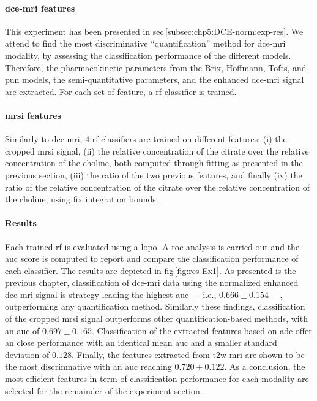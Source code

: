 \paragraph{\ac{dce}-\ac{mri} features} This experiment has been presented in \acs{sec}\,\ref{subsec:chp5:DCE-norm:exp-res}.
We attend to find the most discriminative ``quantification'' method for \ac{dce}-\ac{mri} modality, by assessing the classification performance of the different models.
Therefore, the pharmacokinetic parameters from the Brix, Hoffmann, Tofts, and \ac{pun} models, the semi-quantitative parameters, and the enhanced \ac{dce}-\ac{mri} signal are extracted.
For each set of feature, a \ac{rf} classifier is trained.

\paragraph{\ac{mrsi} features} Similarly to \ac{dce}-\ac{mri}, 4 \ac{rf} classifiers are trained on different features:
(i) the cropped \ac{mrsi} signal,
(ii) the relative concentration of the citrate over the relative concentration of the choline, both computed through fitting as presented in the previous section,
(iii) the ratio of the two previous features, and finally
(iv) the ratio of the relative concentration of the citrate over the relative concentration of the choline, using fix integration bounds.

\paragraph{Results}
Each trained \ac{rf} is evaluated using a \ac{lopo}.
A \ac{roc} analysis is carried out and the \ac{auc} score is computed to report and compare the classification performance of each classifier.
The results are depicted in \acs{fig}\,\ref{fig:res-Ex1}.
As presented is the previous chapter, classification of \ac{dce}-\ac{mri} data using the normalized enhanced \ac{dce}-\ac{mri} signal is strategy leading the highest \ac{auc} --- i.e., $0.666 \pm 0.154$ ---, outperforming any quantification method.
Similarly these findings, classification of the cropped \ac{mrsi} signal outperforms other quantification-based methods, with an \ac{auc} of $0.697 \pm 0.165$.
Classification of the extracted features based on \ac{adc} offer an close performance with an identical mean \ac{auc} and a smaller standard deviation of $0.128$.
Finally, the features extracted from \ac{t2w}-\ac{mri} are shown to be the most discrimnative with an \ac{auc} reaching $0.720 \pm 0.122$.
As a conclusion, the most efficient features in term of classification performance for each modality are selected for the remainder of the experiment section.

